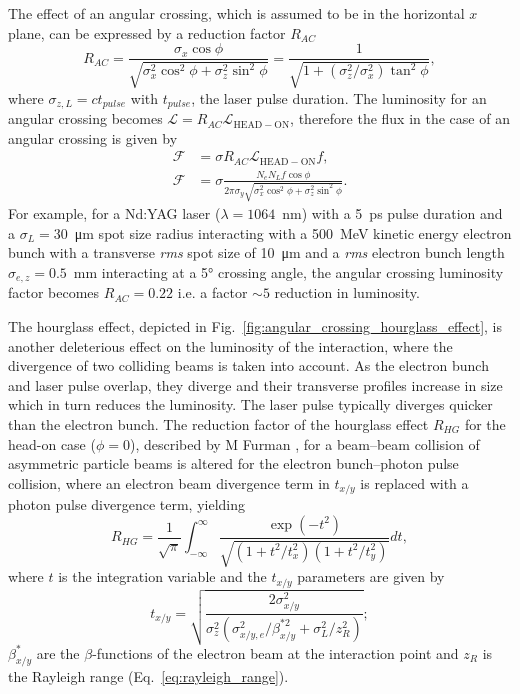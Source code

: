 \documentclass[../main.tex]{subfiles}
\begin{document}
The effect of an angular crossing, which is assumed to be in the horizontal $x$ plane, can be expressed by a reduction factor $R_{AC}$ \cite{suzuki1976general,miyahara2008luminosity}
\begin{equation}
R_{AC} = \frac{\sigma_{x}\cos\phi}{\sqrt{\sigma_{x}^{2}\cos^{2}\phi+\sigma_{z}^{2}\sin^{2}\phi}} = \frac{1}{\sqrt{1+\left(\sigma_{z}^{2}/\sigma_{x}^{2}\right)\tan^{2}\phi}},
\label{eq:angular_crossing_factor}    
\end{equation}
where $\sigma_{z,L} = ct_{pulse}$ with $t_{pulse}$, the laser pulse duration. The luminosity for an angular crossing becomes $\mathcal{L} = R_{AC}\mathcal{L}_{\mathrm{HEAD-ON}}$, therefore the flux in the case of an angular crossing is given by 
\begin{align}
\mathcal{F} &= \sigma R_{AC}\mathcal{L}_{\mathrm{HEAD-ON}}f, \nonumber\\
\mathcal{F} &= \sigma\frac{N_{e}N_{L}f\cos\phi}{2\pi\sigma_{y}\sqrt{\sigma_{x}^{2}\cos^{2}\phi + \sigma_{z}^{2}\sin^{2}\phi}}.
\label{eq:crossing_angle_flux}    
\end{align}
For example, for a Nd:YAG laser ($\lambda = 1064$~\si{\nano\meter}) with a 5~\si{\pico\second} pulse duration and a $\sigma_{L} = 30$~\si{\micro\meter} spot size radius interacting with a 500~\si{\mega\electronvolt} kinetic energy electron bunch with a transverse \textit{rms} spot size of 10~\si{\micro\meter} and a \textit{rms} electron bunch length $\sigma_{e,z} = 0.5$~\si{\milli\meter} interacting at a 5\si{\degree} crossing angle, the angular crossing luminosity factor becomes $R_{AC} = 0.22$ i.e. a factor $\sim5$ reduction in luminosity.

The hourglass effect, depicted in Fig.~\ref{fig:angular_crossing_hourglass_effect}, is another deleterious effect on the luminosity of the interaction, where the divergence of two colliding beams is taken into account. As the electron bunch and laser pulse overlap, they diverge and their transverse profiles increase in size which in turn reduces the luminosity. The laser pulse typically diverges quicker than the electron bunch. The reduction factor of the hourglass effect $R_{HG}$ for the head-on case ($\phi = 0$), described by M Furman \cite{furman1991hourglass}, for a beam--beam collision of asymmetric particle beams is altered for the electron bunch--photon pulse collision, where an electron beam divergence term in $t_{x/y}$ is replaced with a photon pulse divergence term, yielding
\begin{equation}
R_{HG} = \frac{1}{\sqrt{\pi}}\int_{-\infty}^{\infty}\frac{\exp\left(-t^{2}\right)}{\sqrt{\left(1+t^{2}/t_{x}^{2}\right)\left(1+t^{2}/t_{y}^{2}\right)}}dt,
\label{eq:furman_hourglass_reduction}    
\end{equation}
where $t$ is the integration variable and the $t_{x/y}$ parameters are given by
\begin{equation}
t_{x/y} = \sqrt{\frac{2\sigma_{x/y}^{2}}{\sigma_{z}^{2}\left(\sigma_{x/y,e}^{2}/\beta_{x/y}^{*2}+\sigma_{L}^{2}/z_{R}^{2}\right)}};
\label{eq:furman_txy_parameters}    
\end{equation}
$\beta_{x/y}^{*}$ are the $\beta$-functions of the electron beam at the interaction point and $z_{R}$ is the Rayleigh range (Eq.~\ref{eq:rayleigh_range}).
\end{document}
